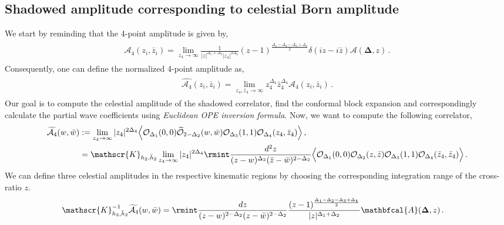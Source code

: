 \subsection{Shadowed amplitude corresponding to celestial Born amplitude}
 We start by reminding that  the 4-point amplitude is given by,
\begin{align}
    \begin{split}
        \mathcal{A}_{4}(z_i,\bar z_i)=\lim_{z_4\to \infty}\frac{1}{|z|^{\Delta_1+\Delta_2}|z_4|^{2\Delta_4}}(z-1)^{\frac{\Delta_1-\Delta_2-\Delta_3+\Delta_4}{2}}\delta(iz-i\bar z) \mathcal{A}(\mathbf \Delta,z)\,.
    \end{split}
\end{align}
Consequently, one can define the normalized 4-point amplitude as,
\begin{align}
    \begin{split}
         \widehat{\mathcal{A}_{4}}(z_i,\bar z_i)=\lim_{z_4,\bar z_4\to \infty}z_4^{\Delta_4} \bar z_4^{\Delta_4} \mathcal{A}_{4}(z_i,\bar z_i)\,.
    \end{split}
\end{align}
Our goal is to compute the celestial amplitude of the shadowed correlator, find the conformal block expansion and correspondingly calculate the partial wave coefficients using \textit{Euclidean OPE inversion formula}.
 Now, we want to compute the following correlator,
\begin{align}
    \begin{split}
    \widetilde{\mathcal{A}_{4}}(w,\bar w)&:=\lim_{z_4\to \infty}|z_4|^{2\Delta_4}\Big\langle\mathcal{O}_{\Delta_1}(0,0)\widetilde{\mathcal{O}}_{2-\Delta_2}(w,\bar w)\mathcal{O}_{\Delta_3}(1,1)\mathcal{O}_{\Delta_4}(z_4,\bar z_4)\Big\rangle\,,\\ &
          =\mathscr{K}_{h_2,\bar h_2}\lim_{z_4\to \infty}|z_4|^{2\Delta_4}\rmint \frac{d^2 z}{(z-w)^{\Delta_2}(\bar z-\bar w)^{2-\Delta_2}}\Big\langle\mathcal{O}_{\Delta_1}(0,0){\mathcal{O}_{\Delta_2}}(z,\bar z)\mathcal{O}_{\Delta_3}(1,1)\mathcal{O}_{\Delta_4}(\bar z_4,\bar z_4)\Big\rangle\,.
    \end{split}
\end{align}
We can define three celestial amplitudes in the respective kinematic regions by choosing the corresponding integration range of the cross-ratio $z$.
\begin{align}
    \begin{split}\label{4.28i}
 \mathscr{K}_{h_2,\bar h_2}^{-1}\widetilde{\mathcal{A}_{4}}(w,\bar w)&=\rmint \frac{dz}{(z-w)^{2-\Delta_2}(z-\bar w)^{2-\Delta_2}} \frac{(z-1)^{\frac{\Delta_1-\Delta_2-\Delta_3+\Delta_4}{2}}}{|z|^{\Delta_1+\Delta_2}} \mathbfcal{A}(\mathbf{\Delta},z)\,.\end{split}\end{align}
